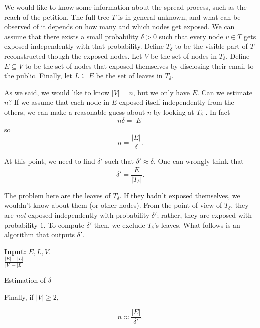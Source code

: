 We would like to know some information about the spread process, such as the reach of the petition. The full tree $T$ is in general unknown, and what can be observed of it depends on how many and which nodes get exposed. We can assume that there exists a small probability $\delta > 0$ such that every node $v \in T$ gets exposed independently with that probability. Define $T_\delta$ to be the visible part of $T$ reconstructed though the exposed nodes. Let $V$ be the set of nodes in $T_\delta$. Define $E \subseteq V$ to be the set of nodes that exposed themselves by disclosing their email to the public. Finally, let $L \subseteq E$ be the set of leaves in $T_\delta$.

As we said, we would like to know $|V| = n$, but we only have $E$. Can we estimate $n$? If we assume that each node in $E$ exposed itself independently from the others, we can make a reasonable guess about $n$ by looking at $T_\delta$ \cite{chainletters}. In fact
\begin{equation}
 n\delta = |E|
\end{equation}
so 
\begin{equation}
n= \frac{|E|}{\delta}.
\end{equation}

At this point, we need to find $\delta'$ such that $\delta' \approx \delta$. One can wrongly think that
\begin{equation}
	\delta' = \frac{|E|}{|T_\delta|}.
\end{equation}

The problem here are the leaves of $T_\delta$. If they hadn't exposed themselves, we wouldn't know about them (or other nodes). From the point of view of $T_\delta$, they are \emph{not} exposed independently with probability $\delta'$; rather, they are exposed with probability $1$. To compute $\delta'$ then, we exclude $T_\delta$'s leaves. What follows is an algorithm that outputs $\delta'$.

\begin{algorithm}
\textbf{Input:} $E, L, V$.\\
\Return $\frac{|E| - |L|}{|V|-|L|}$

\caption{Estimation of $\delta$}
\end{algorithm}

Finally, if $|V| \geq 2$,

\begin{equation}
	 n \approx \frac{|E|}{\delta'}.
\end{equation}

